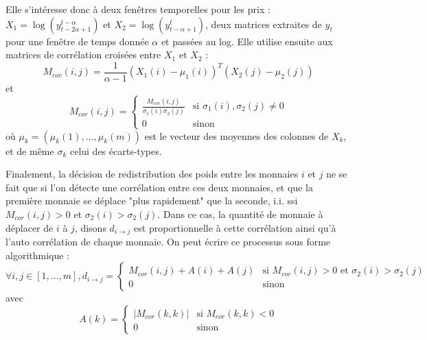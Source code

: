 \documentclass[a4paper, 10pt]{article}
\begin{document}
Elle s'intéresse donc à deux fenêtres temporelles pour les prix : $X_1 = \log \left(y_{t-2\alpha+1}^{t-\alpha} \right)$ et $X_2 = \log \left(y_{t-\alpha+1}^{t}\right)$, deux matrices extraites de $y_t$ pour une fenêtre de temps donnée $\alpha$ et passées au log. Elle utilise ensuite aux matrices de corrélation croisées entre $X_1$ et $X_2$ : 
\begin{equation}
    M_{cov}(i, j) = \frac{1}{\alpha - 1}(X_{1}(i) - \mu_1(i))^{T}(X_2(j) - \mu_2(j))
\end{equation}
et
\begin{equation}
    M_{cor}(i, j) =
        \begin{cases}
            \frac{M_{cov}(i,j)}{\sigma_1(i)\sigma_2(j)} & \text{si } \sigma_1(i), \sigma_2(j) \ne 0 \\
            0                                           & \text{sinon}
        \end{cases}
\end{equation}
où $\mu_k = (\mu_k(1), ..., \mu_k(m))$ est le vecteur des moyennes des colonnes de $X_k$, et de même $\sigma_k$ celui des écarts-types.

Finalement, la décision de redistribution des poids entre les monnaies $i$ et $j$ ne se fait que si l'on détecte une corrélation entre ces deux monnaies, et que la première monnaie se déplace "plus rapidement" que la seconde, i.i. ssi $M_{cor}(i,j) > 0$ et $\sigma_2(i) > \sigma_2(j)$. Dans ce cas, la quantité de monnaie à déplacer de $i$ à $j$, disons $d_{i\rightarrow j}$ est proportionnelle à cette corrélation ainsi qu'à l'auto corrélation de chaque monnaie. On peut écrire ce processus sous forme algorithmique :
\begin{equation}
    \forall i, j \in [1, ..., m], d_{i\rightarrow j} =
        \begin{cases}
            M_{cor}(i,j) + A(i) + A(j) & \text{si } M_{cor}(i,j) > 0 \text{ et } \sigma_2(i) > \sigma_2(j) \\
            0                          & \text{sinon}
        \end{cases}
\end{equation}
avec
\begin{equation}
    A(k) = 
    \begin{cases}
        |M_{cor}(k,k)| & \text{si } M_{cor}(k,k) < 0 \\
        0              & \text{sinon}
    \end{cases}
\end{equation}
\end{document}
